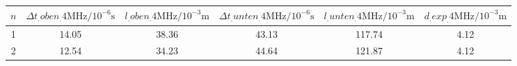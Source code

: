 \label{tab:tabAScan4}
	\begin{tabular}{S[table-format=1.0]S[table-format=2.2]S[table-format=2.2]S[table-format=2.2]S[table-format=2.2]S[table-format=2.2]}
		\toprule
		{$n$} & {$\Delta t_.{oben_.{4\si{\mega\hertz} } }/10^{-6}\si{\second}$} & {$l_.{oben_.{4\si{\mega\hertz} } }/10^{-3}\si{\metre}$} & {$\Delta t_.{unten_.{4\si{\mega\hertz} } }/10^{-6}\si{\second}$} & {$l_.{unten_.{4\si{\mega\hertz} } }/10^{-3}\si{\metre}$} & {$d_.{exp_.{4\si{\mega\hertz} } }/10^{-3}\si{\metre}$} \\
		 & 14.05 & 38.36 & 43.13 & 117.74 & 4.12 \\
		2 & 12.54 & 34.23 & 44.64 & 121.87 & 4.12 \\
		\bottomrule
	\end{tabular}
